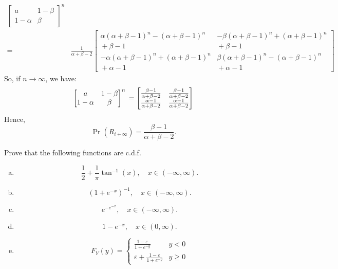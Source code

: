 \documentclass[14pt]{elegantbook}
\begin{document}
\begin{solution}
\begin{enumerate}[(a)]
\begin{align*}
\begin{bmatrix}
                    a&1-\beta\\
                    1-\alpha&\beta
                \end{bmatrix}^n\\=&\frac{1}{\alpha + \beta - 2}\begin{bmatrix}
                    \alpha (\alpha + \beta - 1)^n - (\alpha + \beta - 1)^n & -\beta (\alpha + \beta - 1)^n + (\alpha + \beta - 1)^n \\{} + \beta - 1 &{} + \beta - 1\\
                    -\alpha (\alpha + \beta - 1)^n + (\alpha + \beta - 1)^n &{} \beta (\alpha + \beta - 1)^n - (\alpha + \beta - 1)^n \\{} + \alpha - 1 &{} + \alpha - 1
                \end{bmatrix}
            \end{align*}
            So, if $n\to\infty$, we have:
            \[\begin{bmatrix}
                a&1-\beta\\
                1-\alpha&\beta
            \end{bmatrix}^n\\=\begin{bmatrix}
                \frac{\beta-1}{\alpha+\beta-2}&\frac{\beta-1}{\alpha+\beta-2}\\
                \frac{\alpha-1}{\alpha+\beta-2}&\frac{\alpha-1}{\alpha+\beta-2}
            \end{bmatrix}\]
            Hence, \[
                \Pr(R_{i+\infty})=\frac{\beta-1}{\alpha+\beta-2}. 
            \]
        \end{enumerate}
    \end{solution}
    
    \setcounter{exer}{46}
    \setcounter{chapter}{1}

    \begin{exercise}
        Prove that the following functions are c.d.f. 
        \begin{enumerate}[(a)]
            \item \[\frac{1}{2}+\frac{1}{\pi}\tan^{-1}(x), \quad x\in(-\infty,\infty). \]
            \item \[(1+e^{-x})^{-1}, \quad x\in(-\infty,\infty). \]
            \item \[e^{-e^{-x}}, \quad x\in(-\infty, \infty). \]
            \item \[1-e^{-x}, \quad x\in(0, \infty). \]
            \item \[F_Y(y)=\left\{\begin{matrix}
                \frac{1-\varepsilon}{1+e^{-y}}&y<0\\
                \varepsilon+\frac{1-\varepsilon}{1+e^{-y}}&y\geq0
            \end{matrix}\right.\]
        \end{enumerate} 
    \end{exercise}
\end{document}
